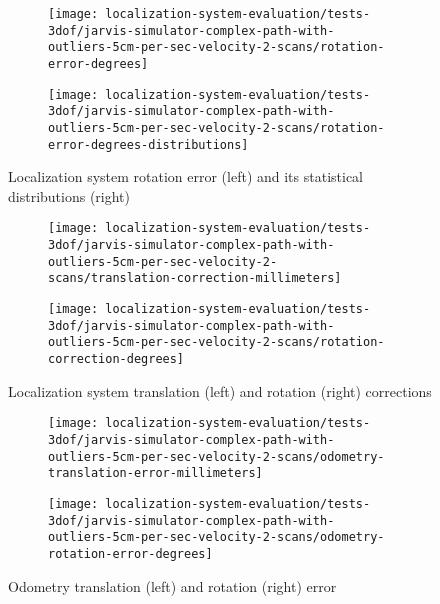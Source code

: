 \begin{figure}[H]
	\centering
	\begin{subfigure}[h]{0.47\textwidth}
		\centering
		\texttt{[image: localization-system-evaluation/tests-3dof/jarvis-simulator-complex-path-with-outliers-5cm-per-sec-velocity-2-scans/rotation-error-degrees]}
	\end{subfigure}
	\begin{subfigure}[h]{0.47\textwidth}
		\centering
		\texttt{[image: localization-system-evaluation/tests-3dof/jarvis-simulator-complex-path-with-outliers-5cm-per-sec-velocity-2-scans/rotation-error-degrees-distributions]}
	\end{subfigure}
	\caption{Localization system rotation error (left) and its statistical distributions (right)}
	\label{fig:localization-system-evaluation_jarvis-simulator-complex-path-with-outliers-5cm-per-sec-velocity-2-scans_rotation-errors}
\end{figure}

\begin{figure}[ht]
	\centering
	\begin{subfigure}[h]{0.47\textwidth}
		\centering
		\texttt{[image: localization-system-evaluation/tests-3dof/jarvis-simulator-complex-path-with-outliers-5cm-per-sec-velocity-2-scans/translation-correction-millimeters]}
	\end{subfigure}
	\begin{subfigure}[h]{0.47\textwidth}
		\centering
		\texttt{[image: localization-system-evaluation/tests-3dof/jarvis-simulator-complex-path-with-outliers-5cm-per-sec-velocity-2-scans/rotation-correction-degrees]}
	\end{subfigure}
	\caption{Localization system translation (left) and rotation (right) corrections}
	\label{fig:localization-system-evaluation_jarvis-simulator-complex-path-with-outliers-5cm-per-sec-velocity-2-scans_translation-rotation-corrections}
\end{figure}

\begin{figure}[ht]
	\centering
	\begin{subfigure}[h]{0.47\textwidth}
		\centering
		\texttt{[image: localization-system-evaluation/tests-3dof/jarvis-simulator-complex-path-with-outliers-5cm-per-sec-velocity-2-scans/odometry-translation-error-millimeters]}
	\end{subfigure}
	\begin{subfigure}[h]{0.47\textwidth}
		\centering
		\texttt{[image: localization-system-evaluation/tests-3dof/jarvis-simulator-complex-path-with-outliers-5cm-per-sec-velocity-2-scans/odometry-rotation-error-degrees]}
	\end{subfigure}
	\caption{Odometry translation (left) and rotation (right) error}
	\label{fig:localization-system-evaluation_jarvis-simulator-complex-path-with-outliers-5cm-per-sec-velocity-2-scans_odometry-translation-rotation-errors}
\end{figure}

